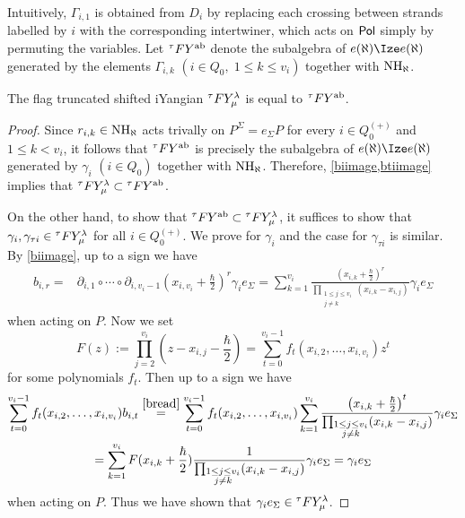 Intuitively, $\Gamma_{i,1}$ is obtained from $D_i$ by replacing each crossing between strands labelled by $i$ with the corresponding intertwiner, which acts on $\mathsf{Pol}$ simply by permuting the variables. Let ${}^\tau F Y^{\text{ab}}$ denote the subalgebra of $e(\aleph)\tR e(\aleph)$ generated by the elements $\Gamma_{i,k}$ $(i\in Q_0,\;1\le k\le v_i)$ together with $\operatorname{NH}_\aleph$.


\begin{theorem}
\label{thm:flag=ab}
    The flag truncated shifted iYangian ${}^\tau F Y_\mu^\lambda$ is equal to ${}^\tau F Y^{\text{ab}}$.
\end{theorem}

\begin{proof}
 Since $r_{i,k}\in \operatorname{NH}_\aleph$ acts trivally on $P^\Sigma=e_{\Sigma} P$ for every $i\in Q_0^{(+)}$ and $1\le k<v_i$, it follows that ${}^\tau F Y^{\text{ab}}$ is precisely the subalgebra of $e(\aleph)\tR e(\aleph)$ generated by $\gamma_i$ $(i\in Q_0)$ together with $\operatorname{NH}_\aleph$.  
Therefore, \cref{biimage,btiimage} implies that ${}^\tau F Y_\mu^\lambda\subset {}^\tau F Y^{\text{ab}}$.

On the other hand, to show that ${}^\tau F Y^{\text{ab}}\subset {}^\tau F Y_\mu^\lambda$, it suffices to show that $\gamma_i ,\gamma_{\tau i} \in {}^\tau F Y_\mu^\lambda$ for all $i\in Q_0^{(+)}$. We prove for $\gamma_i$ and the case for $\gamma_{\tau i}$ is similar. By \cref{biimage}, up to a sign we have
\begin{align}
\label{bread}
    b_{i,r}=&\partial_{i,1}\circ \cdots \circ \partial_{i,v_i-1}(x_{i,v_i}+\frac{\hbar}{2})^r \gamma_i e_{\Sigma}
    =\sum_{k=1}^{v_i}
\frac{\left(x_{i,k}+\frac{\hbar}{2}\right)^r}
{\prod_{\substack{1\le j\le v_i\\ j\ne k}}(x_{i,k}-x_{i,j})} \gamma_i e_{\Sigma}
\end{align}
when acting on $P$. Now we set 
\[F(z):=\prod_{j=2}^{v_i}(z-x_{i,j}-\frac{\hbar}{2})=\sum_{t=0}^{v_i-1}f_t(x_{i,2},\ldots,x_{i,v_i}) z^t\]
for some polynomials $f_t$. Then up to a sign we have
\begin{multline*}
    \sum_{t=0}^{v_i-1} f_t(x_{i,2},\ldots,x_{i,v_i})b_{i,t} \overset{\cref{bread}}{=}  \sum_{t=0}^{v_i-1} f_t(x_{i,2},\ldots,x_{i,v_i}) \sum_{k=1}^{v_i}
\frac{\left(x_{i,k}+\frac{\hbar}{2}\right)^t}
{\prod_{\substack{1\le j\le v_i\\ j\ne k}}(x_{i,k}-x_{i,j})} \gamma_i e_{\Sigma} \\
= \sum_{k=1}^{v_i} F(x_{i,k}+\frac{\hbar}{2})\frac{1}{\prod_{\substack{1\le j\le v_i\\ j\ne k}}(x_{i,k}-x_{i,j})}  \gamma_i e_{\Sigma} =\gamma_i e_{\Sigma}
\end{multline*}
when acting on $P$. Thus we have shown that $\gamma_i e_\Sigma\in {}^\tau F Y_\mu^\lambda$.


\end{proof}
